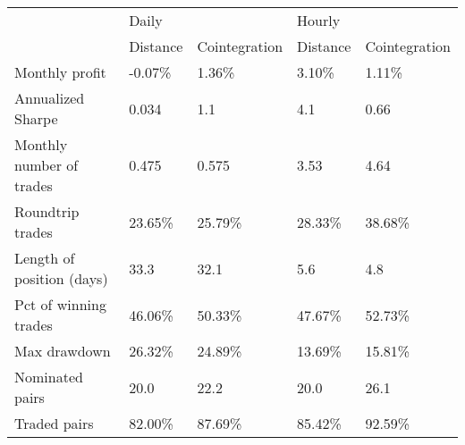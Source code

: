 \begin{tabular}{lllll}
\toprule
{} & \multicolumn{2}{l}{Daily} & \multicolumn{2}{l}{Hourly} \\
{} & Distance & Cointegration & Distance & Cointegration \\
\midrule
Monthly profit            &  -0.07\% &        1.36\% &   3.10\% &        1.11\% \\
Annualized Sharpe         &    0.034 &           1.1 &      4.1 &          0.66 \\
Monthly number of trades  &    0.475 &         0.575 &     3.53 &          4.64 \\
Roundtrip trades          &  23.65\% &       25.79\% &  28.33\% &       38.68\% \\
Length of position (days) &     33.3 &          32.1 &      5.6 &           4.8 \\
Pct of winning trades     &  46.06\% &       50.33\% &  47.67\% &       52.73\% \\
Max drawdown              &  26.32\% &       24.89\% &  13.69\% &       15.81\% \\
Nominated pairs           &     20.0 &          22.2 &     20.0 &          26.1 \\
Traded pairs              &  82.00\% &       87.69\% &  85.42\% &       92.59\% \\
\bottomrule
\end{tabular}
